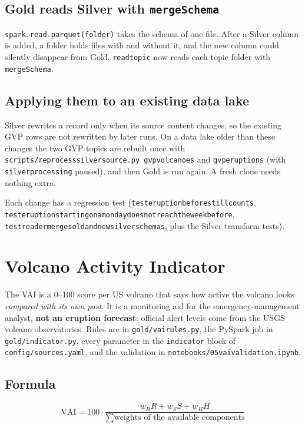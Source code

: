 \documentclass[11pt,a4paper]{article}
\renewcommand{\_}{\textunderscore\allowbreak}
\begin{document}
\subsection{Gold reads Silver with \texttt{mergeSchema}}
\texttt{spark.read.parquet(folder)} takes the schema of one file. After a Silver column is added, a
folder holds files with and without it, and the new column could silently disappear from Gold.
\texttt{read\_topic} now reads each topic folder with \texttt{mergeSchema}.

\subsection{Applying them to an existing data lake}
Silver rewrites a record only when its source content changes, so the existing GVP rows are not rewritten
by later runs. On a data lake older than these changes the two GVP topics are rebuilt once with
\texttt{scripts/reprocess\_silver\_source.py gvp\_volcanoes} and \texttt{gvp\_eruptions} (with
\texttt{silver\_processing} paused), and then Gold is run again. A fresh clone needs nothing extra.

Each change has a regression test (\texttt{test\_eruption\_before\_1677\_still\_counts},
\texttt{test\_eruption\_starting\_on\_a\_monday\_does\_not\_reach\_the\_week\_before},
\texttt{test\_reader\_merges\_old\_and\_new\_silver\_schemas}, plus the Silver transform tests).

\section{Volcano Activity Indicator}\label{sec:vai}

The VAI is a 0--100 score per US volcano that says how active the volcano looks \emph{compared with its
own past}. It is a monitoring aid for the emergency-management analyst, \textbf{not an eruption
forecast}: official alert levels come from the USGS volcano observatories. Rules are in
\texttt{gold/vai\_rules.py}, the PySpark job in \texttt{gold/indicator.py}, every parameter in the
\texttt{indicator} block of \texttt{config/sources.yaml}, and the validation in
\texttt{notebooks/05\_vai\_validation.ipynb}.

\subsection{Formula}
\[
\mathrm{VAI} = 100\cdot\frac{w_R R + w_S S + w_H H}{\sum \text{weights of the available components}}
\]
\end{document}
